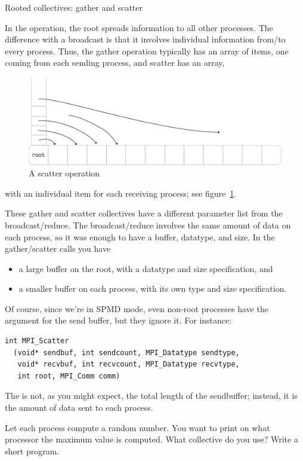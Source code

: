  {Rooted collectives: gather and scatter}

In the  operation, the root spreads information to
all other processes. The difference with a broadcast is that it involves
individual information from/to every process. Thus, the gather operation typically 
has an array of items, one coming from each sending process, and scatter has an array,
\begin{figure}[ht]
  \includegraphics[scale=.12]{graphics/scatter-simple}
  \caption{A scatter operation}
  \label{fig:scatter}
\end{figure}
with an individual item for each receiving process; see figure~\ref{fig:scatter}.

These gather and scatter collectives have a different parameter list from
the broadcast/reduce. The broadcast/reduce involves the same amount
of data on each process, so it was enough to have a buffer, datatype, and size.
In the gather/scatter calls you have
\begin{itemize}
\item a large buffer on the root, with a datatype and size specification, and
\item a smaller buffer on each process, with its own type and size specification.
\end{itemize}
Of course, since we're in SPMD mode, even non-root processes have
the argument for the send buffer, but they ignore it. For instance:
\begin{verbatim}
int MPI_Scatter
  (void* sendbuf, int sendcount, MPI_Datatype sendtype, 
   void* recvbuf, int recvcount, MPI_Datatype recvtype, 
   int root, MPI_Comm comm) 
\end{verbatim}
The  is not, as you might expect, the total length of the
sendbuffer; instead, it is the amount of data sent to each process.

\begin{exercise}
  \label{ex:randomwhere}
  Let each process compute a random number. You want to print on what processor the
  maximum value is computed. What collective do you use? Write
  a short program.
\end{exercise}


